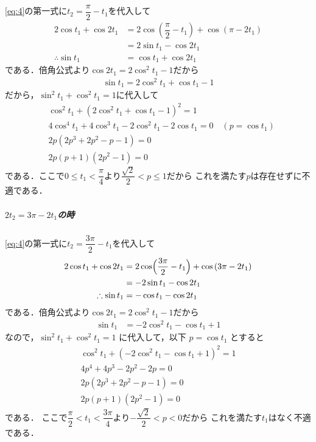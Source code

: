 \documentclass[../../main.tex]{subfiles}
\begin{document}
\cref{eq:4}の第一式に$t_2 = \dfrac{\pi}{2} - t_1$を代入して
\begin{align}
  2\cos t_1 + \cos 2t_1
  & = 2\cos \left(\dfrac{\pi}{2} - t_1\right) + \cos \left(\pi - 2t_1\right) \\
  & = 2\sin t_1 - \cos 2t_1 \\
  \therefore
  \sin t_1 &= \cos t_1 + \cos 2t_1 \label{eq:6}
\end{align}
である．倍角公式より$\cos 2t_1 = 2\cos^2 t_1-1$だから
\begin{align}
  \sin t_1 = 2\cos^2 t_1 + \cos t_1 - 1
\end{align}
だから，$\sin^2t_1 + \cos^2t_1=1$に代入して
\begin{align}
  & \cos^2 t_1 + \left(2\cos^2 t_1 + \cos t_1 - 1\right)^2 = 1 \\
  & 4\cos^4 t_1 + 4\cos^3 t_1 - 2\cos^2 t_1 - 2\cos t_1 = 0 \quad (p = \cos t_1)\\
  & 2p \left(2p^3 + 2p^2 - p - 1\right) = 0 \\
  & 2p (p+1)(2p^2-1) = 0
\end{align}
である．ここで$0\le t_1<\dfrac{\pi}{4}$より$\dfrac{\sqrt{2}}{2}<p \le 1$だから
これを満たす$p$は存在せずに不適である．

\subparagraph{$2t_2 = 3\pi - 2t_1$の時}

\cref{eq:4}の第一式に$t_2 = \dfrac{3\pi}{2} - t_1$を代入して
\begin{align}
  2\cos t_1 + \cos 2t_1
  & =  2\cos \Bigl(\dfrac{3\pi}{2} - t_1\Bigr) + \cos \left(3\pi - 2t_1\right) \\
  & = -2\sin t_1 - \cos 2t_1 \\
  \therefore
  \sin t_1 &= - \cos t_1 - \cos 2t_1
\end{align}
である．倍角公式より$\cos 2t_1 = 2\cos^2 t_1-1$だから
\begin{align}
  \sin t_1 &= - 2\cos^2 t_1 - \cos t_1 + 1
\end{align}
なので，$\sin^2 t_1 + \cos^2 t_1 = 1$ に代入して，以下 $p = \cos t_1$ とすると
\begin{align}
  \cos^2 t_1 + \left(- 2\cos^2 t_1 - \cos t_1 + 1\right)^2 = 1 \\
  4p^4 + 4p^3 - 2p^2 - 2p = 0 \\
  2p(2p^3+2p^2-p-1) = 0 \\
  2p(p+1)(2p^2-1) = 0
\end{align}
である．
ここで$\dfrac{\pi}{2} < t_1 < \dfrac{3\pi}{4}$より$-\dfrac{\sqrt{2}}{2}<p<0$だから
これを満たす$t_1$はなく不適である．
\casesend
\end{document}
